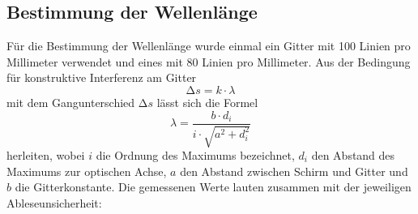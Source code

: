 \subsection{Bestimmung der Wellenlänge}
Für die Bestimmung der Wellenlänge wurde einmal ein Gitter mit 100 Linien pro Millimeter
verwendet und eines mit 80 Linien pro Millimeter.
Aus der Bedingung für konstruktive Interferenz am Gitter
\begin{equation}
  \increment s = k \cdot \lambda
\end{equation}
mit dem Gangunterschied $\increment s$ lässt sich die Formel
\begin{equation}
  \lambda = \frac{b \cdot d_i}{i \cdot \sqrt{a^2+d_i^2}}
\end{equation}
herleiten, wobei $i$ die Ordnung des Maximums bezeichnet, $d_i$ den Abstand des
Maximums zur optischen Achse, $a$ den Abstand zwischen Schirm und Gitter und $b$ die
Gitterkonstante.
Die gemessenen Werte lauten zusammen mit der jeweiligen Ableseunsicherheit:
